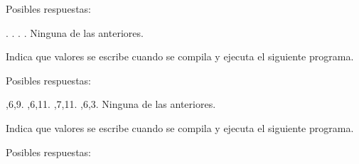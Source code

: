 \documentclass[12pt,answers]{exam}
\begin{document}
\begin{questions}
Posibles respuestas:\\

\begin{checkboxes}
.
.
.
.
\choice   Ninguna de las anteriores.
\end{checkboxes}


    
\newpage
\question[25] Indica que valores se escribe cuando se compila y ejecuta el siguiente programa. 


 



Posibles respuestas:\\

\begin{checkboxes}
,6,9.
,6,11.
,7,11.
,6,3.
\choice   Ninguna de las anteriores.
\end{checkboxes}


\newpage
\question[25] Indica que valores se escribe cuando se compila y ejecuta el siguiente programa. 


 



Posibles respuestas:\\


\end{questions}
\end{document}
